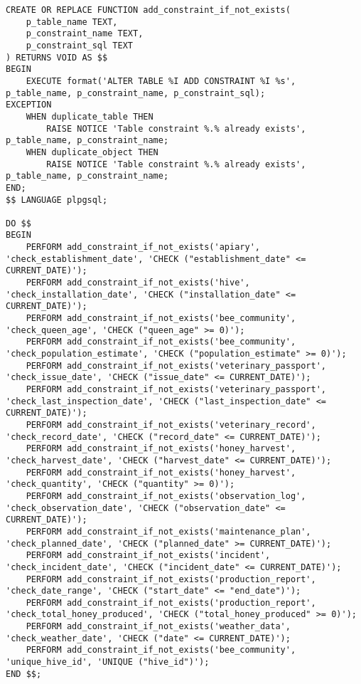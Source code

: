 \documentclass{article}
\begin{document}
\begin{lstlisting}
CREATE OR REPLACE FUNCTION add_constraint_if_not_exists(
    p_table_name TEXT,
    p_constraint_name TEXT,
    p_constraint_sql TEXT
) RETURNS VOID AS $$
BEGIN
    EXECUTE format('ALTER TABLE %I ADD CONSTRAINT %I %s', p_table_name, p_constraint_name, p_constraint_sql);
EXCEPTION
    WHEN duplicate_table THEN
        RAISE NOTICE 'Table constraint %.% already exists', p_table_name, p_constraint_name;
    WHEN duplicate_object THEN
        RAISE NOTICE 'Table constraint %.% already exists', p_table_name, p_constraint_name;
END;
$$ LANGUAGE plpgsql;

DO $$
BEGIN
    PERFORM add_constraint_if_not_exists('apiary', 'check_establishment_date', 'CHECK ("establishment_date" <= CURRENT_DATE)');
    PERFORM add_constraint_if_not_exists('hive', 'check_installation_date', 'CHECK ("installation_date" <= CURRENT_DATE)');
    PERFORM add_constraint_if_not_exists('bee_community', 'check_queen_age', 'CHECK ("queen_age" >= 0)');
    PERFORM add_constraint_if_not_exists('bee_community', 'check_population_estimate', 'CHECK ("population_estimate" >= 0)');
    PERFORM add_constraint_if_not_exists('veterinary_passport', 'check_issue_date', 'CHECK ("issue_date" <= CURRENT_DATE)');
    PERFORM add_constraint_if_not_exists('veterinary_passport', 'check_last_inspection_date', 'CHECK ("last_inspection_date" <= CURRENT_DATE)');
    PERFORM add_constraint_if_not_exists('veterinary_record', 'check_record_date', 'CHECK ("record_date" <= CURRENT_DATE)');
    PERFORM add_constraint_if_not_exists('honey_harvest', 'check_harvest_date', 'CHECK ("harvest_date" <= CURRENT_DATE)');
    PERFORM add_constraint_if_not_exists('honey_harvest', 'check_quantity', 'CHECK ("quantity" >= 0)');
    PERFORM add_constraint_if_not_exists('observation_log', 'check_observation_date', 'CHECK ("observation_date" <= CURRENT_DATE)');
    PERFORM add_constraint_if_not_exists('maintenance_plan', 'check_planned_date', 'CHECK ("planned_date" >= CURRENT_DATE)');
    PERFORM add_constraint_if_not_exists('incident', 'check_incident_date', 'CHECK ("incident_date" <= CURRENT_DATE)');
    PERFORM add_constraint_if_not_exists('production_report', 'check_date_range', 'CHECK ("start_date" <= "end_date")');
    PERFORM add_constraint_if_not_exists('production_report', 'check_total_honey_produced', 'CHECK ("total_honey_produced" >= 0)');
    PERFORM add_constraint_if_not_exists('weather_data', 'check_weather_date', 'CHECK ("date" <= CURRENT_DATE)');
    PERFORM add_constraint_if_not_exists('bee_community', 'unique_hive_id', 'UNIQUE ("hive_id")');
END $$;



\end{lstlisting}
\end{document}
